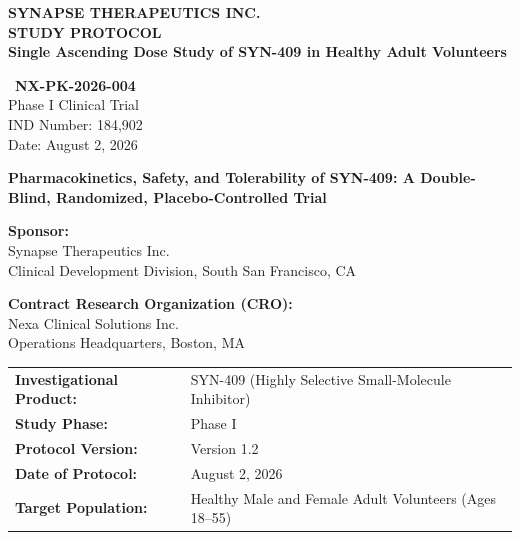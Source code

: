\thispagestyle{empty}

\noindent
\begin{tcolorbox}[
  colback=primary,
  colframe=primary,
  arc=4pt,
  boxrule=0pt,
  left=15pt,
  right=15pt,
  top=20pt,
  bottom=20pt
]
  \begin{minipage}[t]{0.7\textwidth}
    \color{white}
    {\large\sffamily\bfseries SYNAPSE THERAPEUTICS INC.}\\[6pt]
    {\huge\sffamily\bfseries STUDY PROTOCOL}\\[12pt]
    {\color{lightbg!80}\Large\sffamily\bfseries Single Ascending Dose Study of SYN-409 in Healthy Adult Volunteers}
  \end{minipage}%
  \begin{minipage}[t]{0.3\textwidth}
    \raggedleft
    \color{white}
    \faFlask\ \textbf{NX-PK-2026-004}\\[4pt]
    \small
    Phase I Clinical Trial\\
    IND Number: 184,902\\
    Date: August 2, 2026
  \end{minipage}
\end{tcolorbox}

\vspace{25pt}

\begin{center}
  {\LARGE\bfseries Pharmacokinetics, Safety, and Tolerability of SYN-409: A Double-Blind, Randomized, Placebo-Controlled Trial}
\end{center}

\vspace{20pt}

\noindent
\textbf{Sponsor:} \\
Synapse Therapeutics Inc. \\
Clinical Development Division, South San Francisco, CA

\vspace{10pt}

\noindent
\textbf{Contract Research Organization (CRO):} \\
Nexa Clinical Solutions Inc. \\
Operations Headquarters, Boston, MA

\vspace{15pt}

\noindent
\begin{tabularx}{\textwidth}{@{}l X@{}}
  \toprule
  \textbf{Investigational Product:} & SYN-409 (Highly Selective Small-Molecule Inhibitor) \\
  \textbf{Study Phase:} & Phase I \\
  \textbf{Protocol Version:} & Version 1.2 \\
  \textbf{Date of Protocol:} & August 2, 2026 \\
  \textbf{Target Population:} & Healthy Male and Female Adult Volunteers (Ages 18--55) \\
  \bottomrule
\end{tabularx}


